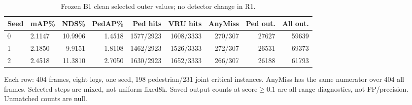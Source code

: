 \begin{table}[t]
\centering\footnotesize
\caption{Frozen B1 clean selected outer values; no detector change in R1.}\label{tab:bclean}
\setlength{\tabcolsep}{3pt}
\begin{tabular}{llrrrrrrr}\toprule
Seed & mAP\% & NDS\% & PedAP\% & Ped hits & VRU hits & AnyMiss & Ped out. & All out.\\\midrule
0 & 2.1147 & 10.9906 & 1.4518 & 1577/2923 & 1608/3333 & 270/307 & 27627 & 59639\\
1 & 2.1850 & 9.9151 & 1.8108 & 1462/2923 & 1526/3333 & 272/307 & 26531 & 69373\\
2 & 2.4518 & 11.3810 & 2.7050 & 1630/2923 & 1652/3333 & 266/307 & 26188 & 61793\\
\bottomrule\end{tabular}
\par\vspace{3pt}\begin{minipage}{0.98\textwidth}\footnotesize Each row: 404 frames, eight logs, one seed, 198 pedestrian/231 joint critical instances. AnyMiss has the same numerator over 404 all frames. Selected steps are mixed, not uniform fixed8k. Saved output counts at score$\geq0.1$ are all-range diagnostics, not FP/precision. Unmatched counts are null.\end{minipage}
\end{table}
